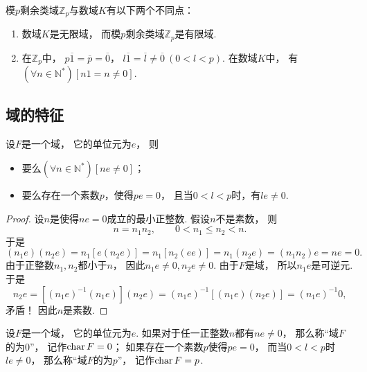 模\(p\)剩余类域\(\mathbb{Z}_p\)与数域\(K\)有以下两个不同点：
\begin{enumerate}
	\item 数域\(K\)是无限域，
	而模\(p\)剩余类域\(\mathbb{Z}_p\)是有限域.

	\item 在\(\mathbb{Z}_p\)中，
	\(p\overline1
	=\overline{p}
	=\overline0\)，
	\(l\overline1
	=\overline{l}
	\neq\overline0\ (0<l<p)\).
	在数域\(K\)中，
	有\((\forall n\in\mathbb{N}^*)[n1=n\neq0]\).
\end{enumerate}

\subsection{域的特征}
\begin{theorem}
设\(F\)是一个域，
它的单位元为\(e\)，
则\begin{itemize}
	\item 要么\((\forall n\in\mathbb{N}^*)[ne\neq0]\)；
	\item 要么存在一个素数\(p\)，使得\(pe=0\)，
	且当\(0<l<p\)时，有\(le\neq0\).
\end{itemize}
\begin{proof}
设\(n\)是使得\(ne=0\)成立的最小正整数.
假设\(n\)不是素数，
则\begin{equation*}
	n=n_1 n_2,
	\qquad
	0<n_1 \leq n_2<n.
\end{equation*}
于是%
\begin{equation*}
	(n_1 e)(n_2 e)
	=n_1[e(n_2 e)]
	=n_1[n_2(ee)]
	=n_1(n_2 e)
	=(n_1 n_2)e
	=ne=0.
\end{equation*}
由于正整数\(n_1,n_2\)都小于\(n\)，
因此\(n_1 e\neq0,
n_2 e\neq0\).
由于\(F\)是域，
所以\(n_1 e\)是可逆元.
于是\begin{equation*}
	n_2 e
	=[(n_1 e)^{-1} (n_1 e)](n_2 e)
	=(n_1 e)^{-1}
	[(n_1 e)(n_2 e)]
	=(n_1 e)^{-1} 0,
\end{equation*}
矛盾！
因此\(n\)是素数.
\end{proof}
\end{theorem}

\begin{definition}\label{definition:域的特征.域的特征}
设\(F\)是一个域，
它的单位元为\(e\).
如果对于任一正整数\(n\)都有\(ne\neq0\)，
那么称“域\(F\)的为0”，
记作\(\operatorname{char} F=0\)；
如果存在一个素数\(p\)使得\(pe=0\)，
而当\(0<l<p\)时\(le\neq0\)，
那么称“域\(F\)的为\(p\)”，
记作\(\operatorname{char} F=p\).
\end{definition}

